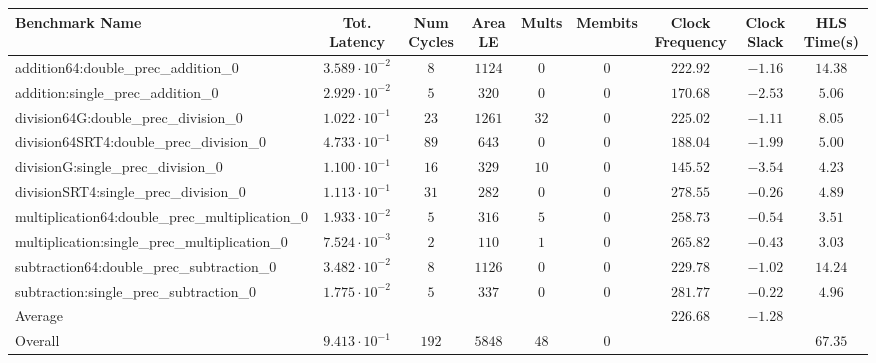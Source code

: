 \begin{tabular}{|l|c|c|c|c|c|c|c|c|}
\hline
Benchmark Name                                   & Tot. Latency            & Num Cycles & Area LE  & Mults  & Membits & Clock Frequency & Clock Slack & HLS Time(s) \\
\hline
addition64:double\_prec\_addition\_0             & $ 3.589 \cdot 10^{-2} $ & $ 8      $ & $ 1124 $ & $ 0  $ & $ 0   $ & $ 222.92      $ & $ -1.16   $ & $ 14.38   $ \\
addition:single\_prec\_addition\_0               & $ 2.929 \cdot 10^{-2} $ & $ 5      $ & $ 320  $ & $ 0  $ & $ 0   $ & $ 170.68      $ & $ -2.53   $ & $ 5.06    $ \\
division64G:double\_prec\_division\_0            & $ 1.022 \cdot 10^{-1} $ & $ 23     $ & $ 1261 $ & $ 32 $ & $ 0   $ & $ 225.02      $ & $ -1.11   $ & $ 8.05    $ \\
division64SRT4:double\_prec\_division\_0         & $ 4.733 \cdot 10^{-1} $ & $ 89     $ & $ 643  $ & $ 0  $ & $ 0   $ & $ 188.04      $ & $ -1.99   $ & $ 5.00    $ \\
divisionG:single\_prec\_division\_0              & $ 1.100 \cdot 10^{-1} $ & $ 16     $ & $ 329  $ & $ 10 $ & $ 0   $ & $ 145.52      $ & $ -3.54   $ & $ 4.23    $ \\
divisionSRT4:single\_prec\_division\_0           & $ 1.113 \cdot 10^{-1} $ & $ 31     $ & $ 282  $ & $ 0  $ & $ 0   $ & $ 278.55      $ & $ -0.26   $ & $ 4.89    $ \\
multiplication64:double\_prec\_multiplication\_0 & $ 1.933 \cdot 10^{-2} $ & $ 5      $ & $ 316  $ & $ 5  $ & $ 0   $ & $ 258.73      $ & $ -0.54   $ & $ 3.51    $ \\
multiplication:single\_prec\_multiplication\_0   & $ 7.524 \cdot 10^{-3} $ & $ 2      $ & $ 110  $ & $ 1  $ & $ 0   $ & $ 265.82      $ & $ -0.43   $ & $ 3.03    $ \\
subtraction64:double\_prec\_subtraction\_0       & $ 3.482 \cdot 10^{-2} $ & $ 8      $ & $ 1126 $ & $ 0  $ & $ 0   $ & $ 229.78      $ & $ -1.02   $ & $ 14.24   $ \\
subtraction:single\_prec\_subtraction\_0         & $ 1.775 \cdot 10^{-2} $ & $ 5      $ & $ 337  $ & $ 0  $ & $ 0   $ & $ 281.77      $ & $ -0.22   $ & $ 4.96    $ \\
\hline
Average                                          & $                     $ & $        $ & $      $ & $    $ & $     $ & $ 226.68      $ & $ -1.28   $ & $         $ \\
\hline
Overall                                          & $ 9.413 \cdot 10^{-1} $ & $ 192    $ & $ 5848 $ & $ 48 $ & $ 0   $ & $             $ & $         $ & $ 67.35   $ \\
\hline
\end{tabular}

